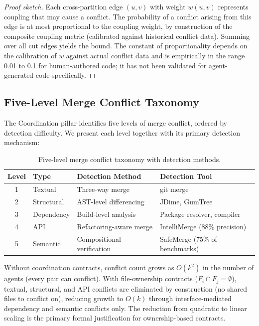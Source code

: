 \documentclass[11pt, a4paper, logo, copyright]{googledeepmind}
\begin{document}
\begin{proof}[Proof sketch]
Each cross-partition edge $(u,v)$ with weight $w(u,v)$ represents coupling that may cause a conflict. The probability of a conflict arising from this edge is at most proportional to the coupling weight, by construction of the composite coupling metric (calibrated against historical conflict data). Summing over all cut edges yields the bound. The constant of proportionality depends on the calibration of $w$ against actual conflict data and is empirically in the range 0.01 to 0.1 for human-authored code; it has not been validated for agent-generated code specifically.
\end{proof}

\subsection{Five-Level Merge Conflict Taxonomy}

The Coordination pillar identifies five levels of merge conflict, ordered by detection difficulty. We present each level together with its primary detection mechanism:

\begin{table}[ht]
\centering
\caption{Five-level merge conflict taxonomy with detection methods.}
\label{tab:conflict-taxonomy}
\begin{tabular}{clll}
\toprule
\textbf{Level} & \textbf{Type} & \textbf{Detection Method} & \textbf{Detection Tool} \\
\midrule
1 & Textual & Three-way merge & git merge \\
2 & Structural & AST-level differencing & JDime, GumTree \\
3 & Dependency & Build-level analysis & Package resolver, compiler \\
4 & API & Refactoring-aware merge & IntelliMerge (88\% precision) \\
5 & Semantic & Compositional verification & SafeMerge (75\% of benchmarks) \\
\bottomrule
\end{tabular}
\end{table}

Without coordination contracts, conflict count grows as $O(k^2)$ in the number of agents (every pair can conflict). With file-ownership contracts ($F_i \cap F_j = \emptyset$), textual, structural, and API conflicts are eliminated by construction (no shared files to conflict on), reducing growth to $O(k)$ through interface-mediated dependency and semantic conflicts only. The reduction from quadratic to linear scaling is the primary formal justification for ownership-based contracts.
\end{document}

